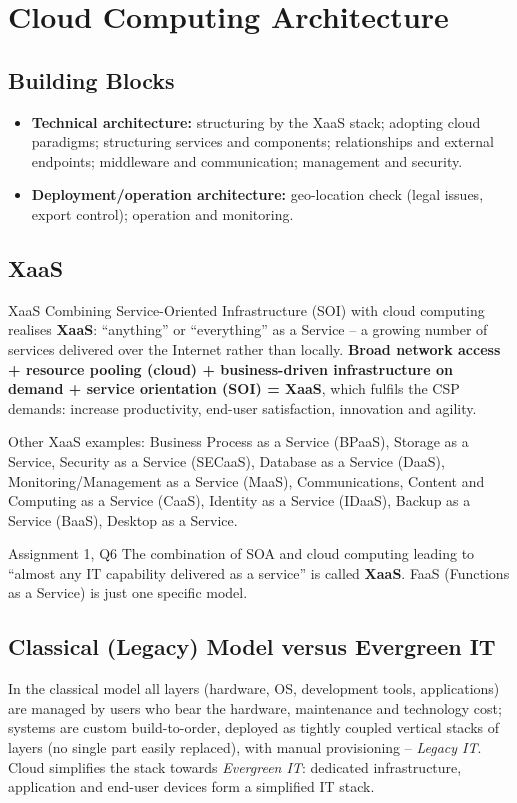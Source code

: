 \documentclass[11pt,a4paper,openany]{report}
\begin{document}
\section{Cloud Computing Architecture}
\subsection{Building Blocks}
\begin{itemize}[leftmargin=*]
  \item \textbf{Technical architecture:} structuring by the XaaS stack; adopting cloud paradigms;
        structuring services and components; relationships and external endpoints; middleware and
        communication; management and security.
  \item \textbf{Deployment/operation architecture:} geo-location check (legal issues, export control);
        operation and monitoring.
\end{itemize}

\subsection{XaaS}
\begin{defbox}{XaaS}
Combining Service-Oriented Infrastructure (SOI) with cloud computing realises \textbf{XaaS}: ``anything'' or
``everything'' as a Service -- a growing number of services delivered over the Internet rather than
locally. \textbf{Broad network access + resource pooling (cloud) + business-driven infrastructure on demand +
service orientation (SOI) = XaaS}, which fulfils the CSP demands: increase productivity, end-user
satisfaction, innovation and agility.
\end{defbox}
Other XaaS examples: Business Process as a Service (BPaaS), Storage as a Service, Security as a Service
(SECaaS), Database as a Service (DaaS), Monitoring/Management as a Service (MaaS), Communications, Content and
Computing as a Service (CaaS), Identity as a Service (IDaaS), Backup as a Service (BaaS), Desktop as a Service.

\begin{notebox}{Assignment 1, Q6}
The combination of SOA and cloud computing leading to ``almost any IT capability delivered as a service'' is
called \textbf{XaaS}. FaaS (Functions as a Service) is just one specific model.
\end{notebox}

\subsection{Classical (Legacy) Model versus Evergreen IT}
In the classical model all layers (hardware, OS, development tools, applications) are managed by users who
bear the hardware, maintenance and technology cost; systems are custom build-to-order, deployed as
tightly coupled vertical stacks of layers (no single part easily replaced), with manual provisioning --
\emph{Legacy IT}. Cloud simplifies the stack towards \emph{Evergreen IT}: dedicated infrastructure,
application and end-user devices form a simplified IT stack.
\end{document}
